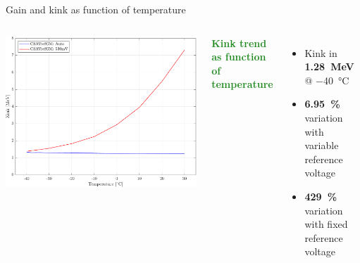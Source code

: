 \documentclass[aspectratio=169,xcolor=dvipsnames]{beamer} %
\newcommand{\xmark}{\ding{55}}
\newcommand{\greencheck}{{\color{ForestGreen}\checkmark}}
\newcommand{\redcross}{{\color{Red}\xmark}}
\begin{document}
\begin{frame}{Gain and kink as function of temperature}
\begin{columns}
            \begin{columns}
                \addtolength{\leftmargini}{\labelsep}
                    \vskip0.1cm
                    \centering
                    \includegraphics[width=1.1\textwidth]{images/temperature_effects/plot_pedestal_gain_auto_530mV.pdf}
                    
                    \textcolor{ForestGreen}{\textbf{Kink trend as function of temperature}}
                    \vspace{0.1cm}
                    \begin{itemize}
                        \item Kink in \textbf{\SI{1.28}{\mega\electronvolt}} @ \SI{-40}{\celsius}
                        \item \textbf{\SI{6.95}{\percent}} variation with variable reference voltage \greencheck
                        \item \textbf{\SI{429}{\percent}} variation with fixed reference voltage \redcross
                    \end{itemize}
            \end{columns}
            \vspace{0.5cm}
    \end{columns}
\end{frame}


\end{document}

